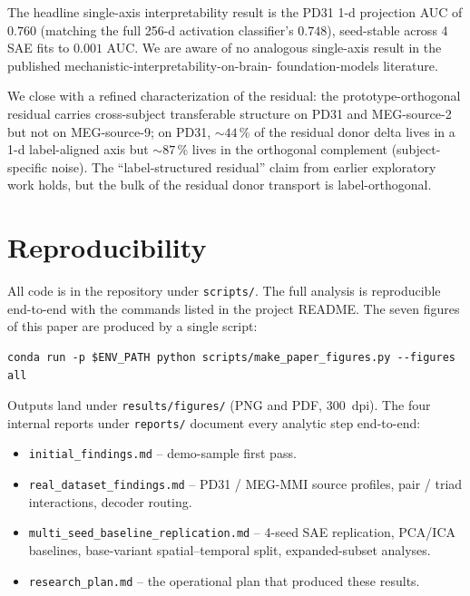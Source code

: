 \documentclass[11pt]{article}
\begin{document}
The headline single-axis interpretability result is the PD31 1-d projection
AUC of $0.760$ (matching the full 256-d activation classifier's $0.748$),
seed-stable across 4 SAE fits to $0.001$ AUC. We are aware of no analogous
single-axis result in the published mechanistic-interpretability-on-brain-
foundation-models literature.

We close with a refined characterization of the residual: the
prototype-orthogonal residual carries cross-subject transferable structure on
PD31 and MEG-source-2 but not on MEG-source-9; on PD31, $\sim 44\,\%$ of the
residual donor delta lives in a 1-d label-aligned axis but $\sim 87\,\%$ lives
in the orthogonal complement (subject-specific noise). The ``label-structured
residual'' claim from earlier exploratory work holds, but the bulk of the
residual donor transport is label-orthogonal.

\section*{Reproducibility}\label{sec:repro}

All code is in the repository under \texttt{scripts/}. The full analysis is
reproducible end-to-end with the commands listed in the project README. The
seven figures of this paper are produced by a single script:
\begin{verbatim}
conda run -p $ENV_PATH python scripts/make_paper_figures.py --figures all
\end{verbatim}
Outputs land under \texttt{results/figures/} (PNG and PDF, 300~dpi). The four
internal reports under \texttt{reports/} document every analytic step
end-to-end:
\begin{itemize}
\item \texttt{initial\_findings.md} -- demo-sample first pass.
\item \texttt{real\_dataset\_findings.md} -- PD31 / MEG-MMI source profiles,
  pair / triad interactions, decoder routing.
\item \texttt{multi\_seed\_baseline\_replication.md} -- 4-seed SAE
  replication, PCA/ICA baselines, base-variant spatial--temporal split,
  expanded-subset analyses.
\item \texttt{research\_plan.md} -- the operational plan that produced these
  results.
\end{itemize}
\end{document}
